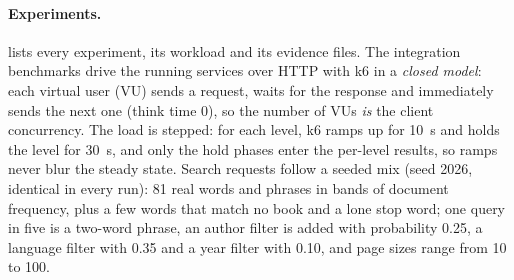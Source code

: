 \documentclass[10pt,a4paper]{article}
\begin{document}
\paragraph{Experiments.}
 lists every experiment, its workload and its evidence
files. The integration benchmarks drive the running services over HTTP with
k6 in a \emph{closed model}: each virtual user (VU) sends a request, waits for
the response and immediately sends the next one (think time 0), so the number
of VUs \emph{is} the client concurrency. The load is stepped: for each level,
k6 ramps up for 10~s and holds the level for 30~s, and only the hold phases
enter the per-level results, so ramps never blur the steady state. Search
requests follow a seeded mix (seed 2026, identical in every run): 81 real
words and phrases in bands of document frequency, plus a few words that match
no book and a lone stop word; one query in five is a two-word phrase, an
author filter is added with probability 0.25, a language filter with 0.35 and
a year filter with 0.10, and page sizes range from 10 to 100.
\end{document}

